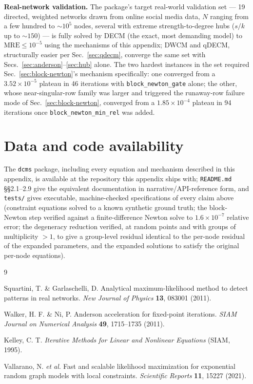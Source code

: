 \documentclass[10pt]{article}
\begin{document}
\textbf{Real-network validation.} The package's target real-world
validation set --- 19 directed, weighted networks drawn from online social
media data, $N$ ranging from a few hundred to $\sim10^5$ nodes, several
with extreme strength-to-degree hubs ($s/k$ up to $\sim150$) --- is fully
solved by DECM (the exact, most demanding model) to $\mathrm{MRE}\le10^{-5}$
using the mechanisms of this appendix; DWCM and qDECM, structurally easier
per Sec.~\ref{sec:qdecm}, converge the same set with Secs.~\ref{sec:anderson}--\ref{sec:hub}
alone. The two hardest instances in the set required
Sec.~\ref{sec:block-newton}'s mechanism specifically: one converged from a
$3.52\times10^{-5}$ plateau in 46 iterations with
\texttt{block\_newton\_gate} alone; the other, whose near-singular-row
family was larger and triggered the runaway-row failure mode of
Sec.~\ref{sec:block-newton}, converged from a $1.85\times10^{-4}$ plateau
in 94 iterations once \texttt{block\_newton\_min\_rel} was added.

\section*{Data and code availability}
The \texttt{dcms} package, including every equation and mechanism
described in this appendix, is available at the repository this appendix
ships with; \texttt{README.md} \S\S2.1--2.9 give the equivalent
documentation in narrative/API-reference form, and \texttt{tests/} gives
executable, machine-checked specifications of every claim above (constraint
equations solved to a known synthetic ground truth; the block-Newton step
verified against a finite-difference Newton solve to $1.6\times10^{-7}$
relative error; the degeneracy reduction verified, at random points and with
groups of multiplicity $>1$, to give a group-level residual identical to
the per-node residual of the expanded parameters, and the expanded
solutions to satisfy the original per-node equations).

\begin{thebibliography}{9}

Squartini, T. \& Garlaschelli, D.
Analytical maximum-likelihood method to detect patterns in real networks.
\textit{New Journal of Physics} \textbf{13}, 083001 (2011).

Walker, H. F. \& Ni, P.
Anderson acceleration for fixed-point iterations.
\textit{SIAM Journal on Numerical Analysis} \textbf{49}, 1715--1735 (2011).

Kelley, C. T.
\textit{Iterative Methods for Linear and Nonlinear Equations} (SIAM, 1995).

Vallarano, N. \textit{et al.}
Fast and scalable likelihood maximization for exponential random graph models with local constraints.
\textit{Scientific Reports} \textbf{11}, 15227 (2021).

\end{thebibliography}
\end{document}
